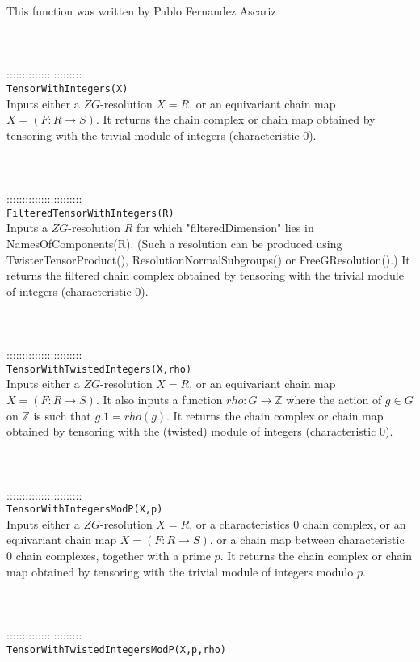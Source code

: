 \documentclass[a4paper,11pt]{report}
\begin{document}
{ This function was written by Pablo Fernandez Ascariz \\
 \\
 \\
 \\
 ::::::::::::::::::::::::\\
 \texttt{TensorWithIntegers(X) }\\
 

 Inputs either a $ZG$-resolution $X=R$, or an equivariant chain map $X = (F:R \longrightarrow S)$. It returns the chain complex or chain map obtained by tensoring with the
trivial module of integers (characteristic 0). \\
 \\
 \\
 \\
 ::::::::::::::::::::::::\\
 \texttt{FilteredTensorWithIntegers(R) }\\
 

 Inputs a $ZG$-resolution $R$ for which "filteredDimension" lies in NamesOfComponents(R). (Such a resolution
can be produced using TwisterTensorProduct(), ResolutionNormalSubgroups() or
FreeGResolution().) It returns the filtered chain complex obtained by
tensoring with the trivial module of integers (characteristic 0). \\
 \\
 \\
 \\
 ::::::::::::::::::::::::\\
 \texttt{TensorWithTwistedIntegers(X,rho) }\\
 

 Inputs either a $ZG$-resolution $X=R$, or an equivariant chain map $X = (F:R \longrightarrow S)$. It also inputs a function $rho\colon G\rightarrow \mathbb Z$ where the action of $g \in G$ on $\mathbb Z$ is such that $g.1 = rho(g)$. It returns the chain complex or chain map obtained by tensoring with the
(twisted) module of integers (characteristic 0). \\
 \\
 \\
 \\
 ::::::::::::::::::::::::\\
 \texttt{TensorWithIntegersModP(X,p) }\\
 

 Inputs either a $ZG$-resolution $X=R$, or a characteristics 0 chain complex, or an equivariant chain map $X = (F:R \longrightarrow S)$, or a chain map between characteristic 0 chain complexes, together with a
prime $p$. It returns the chain complex or chain map obtained by tensoring with the
trivial module of integers modulo $p$. \\
 \\
 \\
 \\
 ::::::::::::::::::::::::\\
 \texttt{TensorWithTwistedIntegersModP(X,p,rho)}\\
 

}
\end{document}
